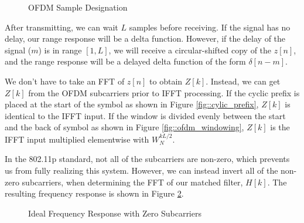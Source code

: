 \documentclass[conference]{IEEEtran}
\begin{document}
		\begin{figure}[H]
			\centering
    			\caption{OFDM Sample Designation}
    			\label{fig::ofdm_radar_waveform}
  	  	\end{figure}
		
		After transmitting, we can wait $L$ samples before receiving. If the signal has no delay, our range response will be a delta function. However, if the delay of the signal ($m$) is in range $[1, L]$, we will receive a circular-shifted copy of the $z[n]$, and the range response will be a delayed delta function of the form $\delta[n-m]$. 
		
		We don't have to take an FFT of $z[n]$ to obtain $Z[k]$. Instead, we can get $Z[k]$ from the OFDM subcarriers prior to IFFT processing. If the cyclic prefix is placed at the start of the symbol as shown in Figure \ref{fig::cylic_prefix}, $Z[k]$ is identical to the IFFT input. If the window is divided evenly between the start and the back of symbol as shown in Figure \ref{fig::ofdm_windowing}, $Z[k]$ is the IFFT input multiplied elementwise with $W_N^{kL/2}$.
		
		In the 802.11p standard, not all of the subcarriers are non-zero, which prevents us from fully realizing this system. However, we can instead invert all of the non-zero subcarriers, when determining the FFT of our matched filter, $H[k]$. The resulting frequency response is shown in Figure \ref{fig::ofdm_radar_freq_resp_no_window}.
		
		\begin{figure}[H]
			\centering
    			\caption{Ideal Frequency Response with Zero Subcarriers}
    			\label{fig::ofdm_radar_freq_resp_no_window}
  	  	\end{figure}
		
\end{document}

